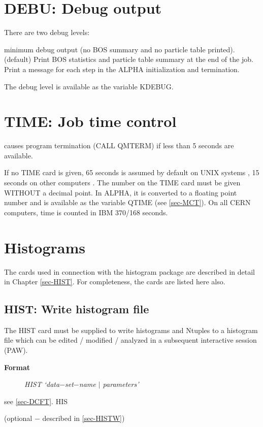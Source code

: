 \section{\label{sec-DCDEBU}DEBU: Debug output}
\par
There are two debug levels:
\begin{indentlist}{ 2.50cm}{ 2.75cm}
minimum debug output (no BOS summary and no particle
table printed).
(default) Print BOS statistics and particle table
summary
at the end of the job.
Print a message for each step in the ALPHA initialization and
termination.
\end{indentlist}
The debug level is
available as the variable KDEBUG.
\section{\label{sec-DCTIME}TIME: Job time control}
\par
\par
\begin{indentlist}{ 2.50cm}{ 2.75cm}
causes program termination (CALL QMTERM) if less than 5 seconds
are available.
 
If no TIME card is given, 65 seconds is assumed by default on UNIX systems , 15 seconds on
other computers .
The number on the TIME card must be given WITHOUT a decimal
point. In ALPHA, it is converted to a floating point number
and is available as the variable QTIME (see
\ref{sec-MCT}).
On all CERN computers, time is counted in
IBM 370/168 seconds.
\end{indentlist}
 
\section{\label{sec-DCHIST}Histograms}
\par
The cards used in connection with the histogram package are described
in detail
in Chapter \ref{sec-HIST}.
For completeness, the cards are listed here also.
 
\subsection{\label{sec-DCHW}HIST: Write histogram file}
\par
The HIST card must be supplied to write histograms and Ntuples to
a
histogram file which can be edited / modified / analyzed in a
subsequent interactive session (PAW).
\begin{description}\item[\bf{Format
}]{\it HIST `data$-$set$-$name $\mid$ parameters'}\end{description}
\begin{indentlist}{ 4.50cm}{ 4.75cm}
see \ref{sec-DCFT}.
HIS
 
(optional $-$ described in \ref{sec-HISTW})
\end{indentlist}
 
